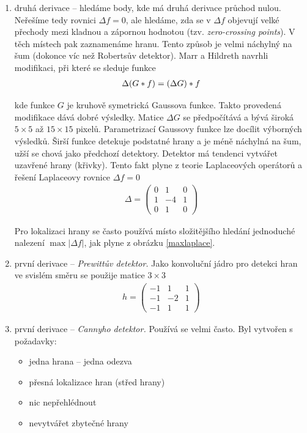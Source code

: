 \begin{enumerate}
\item druhá derivace -- hledáme body, kde má druhá derivace průchod nulou. Neřešíme tedy rovnici $\Delta f=0$, ale hledáme,
zda se v $\Delta f$ objevují velké přechody mezi kladnou a zápornou hodnotou (tzv. \emph{zero-crossing points}). V těch 
místech pak zaznamenáme hranu. Tento způsob je velmi náchylný na šum (dokonce víc než Robertsův detektor). Marr a Hildreth
navrhli modifikaci, při které se sleduje funkce
\begin{align}
\Delta (G\ast f)=(\Delta G)\ast f
\end{align}

kde funkce $G$ je kruhově symetrická Gaussova funkce. Takto provedená modifikace dává dobré výsledky. Matice $\Delta G$ 
se předpočítává a bývá široká $5\times5$ až $15\times15$ pixelů. Parametrizací Gaussovy funkce lze docílit výborných 
výsledků. Širší funkce detekuje podstatné hrany a je méně náchylná na šum, užší se chová jako předchozí detektory.
Detektor má tendenci vytvářet uzavřené hrany (křivky). Tento fakt plyne z teorie Laplaceových operátorů a řešení
Laplaceovy rovnice $\Delta f=0$
\begin{align}
\Delta =\left(\begin{array}{ccc}0&1&0\\1&-4&1\\0&1&0\end{array}\right)
\end{align}

Pro lokalizaci hrany se často používá místo složitějšího hledání  jednoduché nalezení $\max|\Delta f|$, 
jak plyne z obrázku \ref{maxlaplace}.
\item první derivace -- \emph{Prewittův detektor.}
Jako konvoluční jádro pro detekci hran ve svislém směru se použije matice $3\times3$
\begin{align}
h =\left(\begin{array}{ccc}-1&1&1\\-1&-2&1\\-1&1&1\end{array}\right)
\end{align}

\item první derivace -- \emph{Cannyho detektor.} Používá se velmi často. Byl vytvořen s požadavky:
\begin{itemize} 
\item jedna hrana -- jedna odezva
\item přesná lokalizace hran (střed hrany)
\item nic nepřehlédnout
\item nevytvářet zbytečné hrany
\end{itemize}


\end{enumerate}
